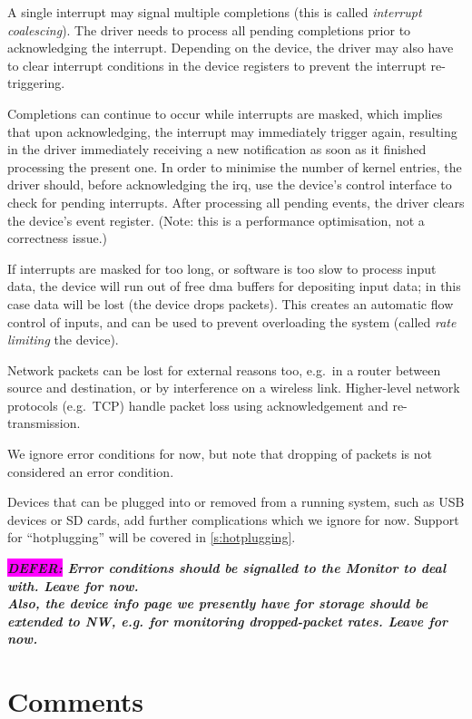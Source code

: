 \documentclass[a4paper,12pt]{report}
\newcommand{\DEFER}[1]{\textbf{\textsl{\colorbox{magenta}{DEFER:} #1}}}
\newcommand{\DEFER}[1]{\relax}
\begin{document}
A single interrupt
may signal multiple completions (this is called \emph{interrupt
  coalescing}). The driver needs to process all pending completions
prior to acknowledging the interrupt. Depending on the device, the
driver may also have to clear interrupt conditions in the device
registers to prevent the interrupt re-triggering.

Completions can continue to occur while interrupts are masked, which
implies that upon acknowledging, the interrupt may immediately trigger
again, resulting in the driver immediately receiving a new
notification as soon as it finished processing the present one. In
order to minimise the number of kernel entries, the driver should,
before acknowledging the \gls{irq}, use the device's control interface to
check for pending interrupts. After processing all pending events,
the driver clears the device's event register. (Note: this is a performance
optimisation, not a correctness issue.)

If interrupts are masked for too long, or software is too slow to
process input data, the device will run out of free \gls{dma} buffers
for depositing input data; in this case data will be lost
(the device drops packets). This creates an automatic flow control of inputs,
and can be used to prevent overloading the system (called \emph{rate
  limiting} the device).

Network packets can be lost for external reasons too, e.g.\ in a
router between source and destination, or by interference on a
wireless link. Higher-level network protocols
(e.g.\ TCP) handle packet loss using acknowledgement and re-transmission.

We ignore error conditions for now, but note that dropping of packets
is not considered an error condition.

Devices that can be plugged into or removed from a running system,
such as USB devices or SD cards, add further complications which we
ignore for now. Support for ``hotplugging'' will be covered in
\autoref{s:hotplugging}.

\DEFER{Error conditions should be signalled to the Monitor to deal
  with. Leave for now.\\
  Also, the device info page we presently have for storage should be
  extended to NW, e.g. for monitoring dropped-packet rates. Leave for now.}

\section{Comments}
\end{document}
